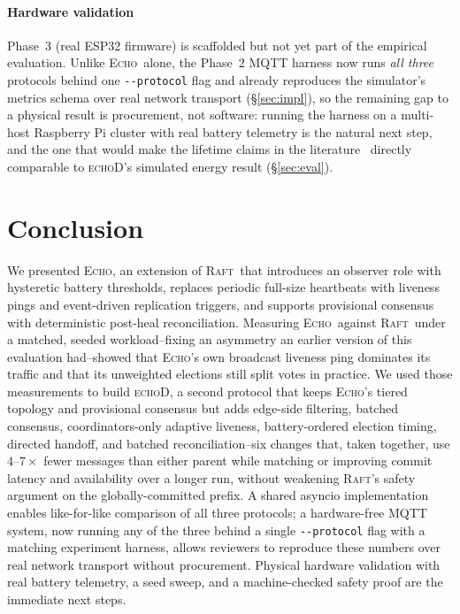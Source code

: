 \documentclass[conference]{IEEEtran}
\newcommand{\echoproto}{\textsc{Echo}\xspace}
\newcommand{\raftproto}{\textsc{Raft}\xspace}
\newcommand{\echodproto}{\textsc{echoD}\xspace}
\begin{document}
\paragraph{Hardware validation}
Phase~3 (real ESP32 firmware) is scaffolded but not yet part of the
empirical evaluation. Unlike \echoproto\ alone, the Phase~2 MQTT harness
now runs \emph{all three} protocols behind one \texttt{-{}-protocol}
flag and already reproduces the simulator's metrics schema over real
network transport (\S\ref{sec:impl}), so the remaining gap to a
physical result is procurement, not software: running the harness on a
multi-host Raspberry Pi cluster with real battery telemetry is the
natural next step, and the one that would make the lifetime claims in
the literature~\cite{barros2023edraft,nakagawa2017energy} directly
comparable to \echodproto's simulated energy result
(\S\ref{sec:eval}).

\section{Conclusion}\label{sec:conclusion}
We presented \echoproto, an extension of \raftproto\ that introduces
an observer role with hysteretic battery thresholds, replaces periodic
full-size heartbeats with liveness pings and event-driven replication
triggers, and supports provisional consensus with deterministic
post-heal reconciliation. Measuring \echoproto\ against \raftproto\
under a matched, seeded workload--fixing an asymmetry an earlier
version of this evaluation had--showed that \echoproto's own broadcast
liveness ping dominates its traffic and that its unweighted elections
still split votes in practice. We used those measurements to build
\echodproto, a second protocol that keeps \echoproto's tiered topology
and provisional consensus but adds edge-side filtering, batched
consensus, coordinators-only adaptive liveness, battery-ordered
election timing, directed handoff, and batched reconciliation--six
changes that, taken together, use $4$--$7\times$ fewer messages than
either parent while matching or improving commit latency and
availability over a longer run, without weakening \raftproto's safety
argument on the globally-committed prefix. A shared asyncio
implementation enables like-for-like comparison of all three
protocols; a hardware-free MQTT system, now running any of the three
behind a single \texttt{-{}-protocol} flag with a matching experiment
harness, allows reviewers to reproduce these numbers over real network
transport without procurement. Physical hardware validation with real
battery telemetry, a seed sweep, and a machine-checked safety proof are
the immediate next steps.
\end{document}
